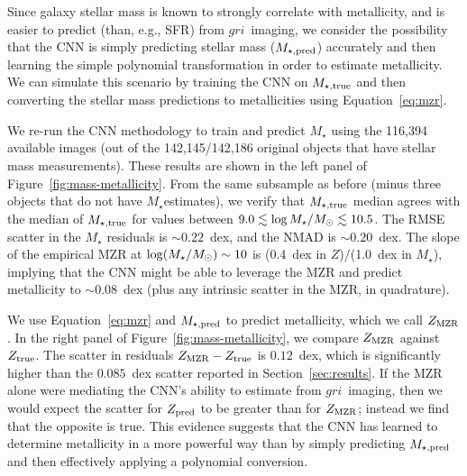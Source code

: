 \documentclass[fleqn,usenatbib]{mnras}
\newcommand{\sdssg}{\hbox{$g$}}
\newcommand{\sdssr}{\hbox{$r$}}
\newcommand{\sdssi}{\hbox{$i$}}
\newcommand{\mstar}{\hbox{$M_{\star}$}}
\newcommand{\msol}{\hbox{$M_\odot$}}
\newcommand{\eg}{e.g.}
\begin{document}
Since galaxy stellar mass is known to strongly correlate with metallicity, and is easier to predict (than, \eg, SFR) from \sdssg\sdssr\sdssi\ imaging, we consider the possibility that the CNN is simply predicting stellar mass ($M_{\star,\rm pred}$) accurately and then learning the simple polynomial transformation in order to estimate metallicity. We can simulate this scenario by training the CNN on $M_{\star, \rm true}$ and then converting the stellar mass predictions to metallicities using Equation~\ref{eq:mzr}.

We re-run the CNN methodology to train and predict $M_{\star}$ using the 116,394 available images (out of the 142,145/142,186 original objects that have stellar mass measurements). These results are shown in the left panel of Figure~\ref{fig:mass-metallicity}. From the same subsample as before (minus three objects that do not have \mstar estimates), we verify that $M_{\rm \star, true}$ median agrees with the median of $M_{\rm \star, true}$ for values between $9.0 \lesssim \log \mstar /\msol \lesssim 10.5$. The RMSE scatter in the \mstar{} residuals is $\sim 0.22$~dex, and the NMAD is $\sim 0.20$~dex. The slope of the empirical MZR at $\log (\mstar / \msol) \sim 10$ is (0.4~dex in $Z$)/(1.0~dex in \mstar), implying that the CNN might be able to leverage the MZR and predict metallicity to $\sim 0.08$~dex (plus any intrinsic scatter in the MZR, in quadrature).

We use Equation~\ref{eq:mzr} and $M_{\star,\rm pred}$ to predict metallicity, which we call $Z_{\rm MZR}$. In the right panel of Figure~\ref{fig:mass-metallicity}, we compare $Z_{\rm MZR}$ against $Z_{\rm true}$. The scatter in residuals $Z_{\rm MZR} - Z_{\rm true}$ is $0.12$~dex, which is significantly higher than the $0.085$~dex scatter reported in Section~\ref{sec:results}. If the MZR alone were mediating the CNN's ability to estimate from
\sdssg\sdssr\sdssi\ imaging, then we would expect the scatter for $Z_{\rm pred}$ to be greater than for $Z_{\rm MZR}$; instead we find that the opposite is true. This evidence suggests that the CNN has learned to determine metallicity in a more powerful way than by simply predicting $M_{\rm \star,pred}$ and then effectively applying a polynomial conversion.
\end{document}
